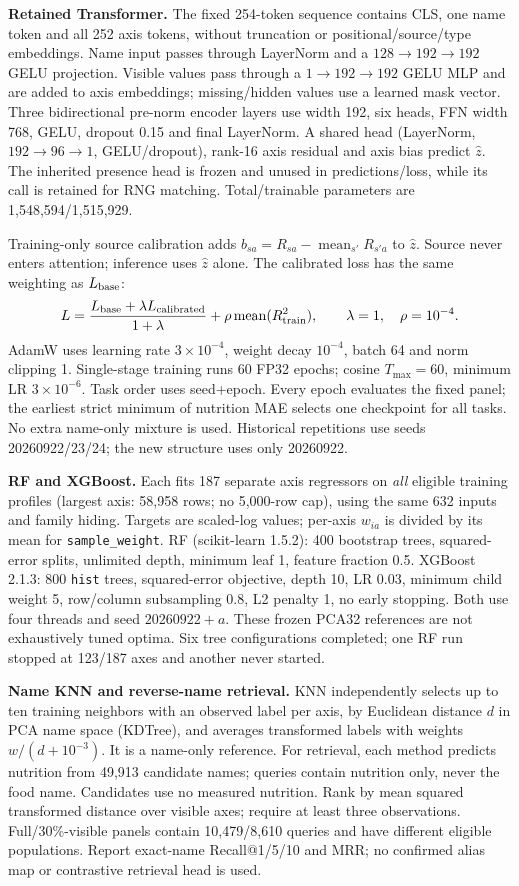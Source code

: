 \documentclass[10pt,a4paper]{article}
\newcommand{\sub}[1]{\textbf{#1}\enspace}
\begin{document}
\sub{Retained Transformer.}
The fixed 254-token sequence contains CLS, one name token and all 252 axis tokens, without truncation or positional/source/type embeddings. Name input passes through LayerNorm and a $128\to192\to192$ GELU projection. Visible values pass through a $1\to192\to192$ GELU MLP and are added to axis embeddings; missing/hidden values use a learned mask vector. Three bidirectional pre-norm encoder layers use width 192, six heads, FFN width 768, GELU, dropout 0.15 and final LayerNorm. A shared head (LayerNorm, $192\to96\to1$, GELU/dropout), rank-16 axis residual and axis bias predict $\hat z$. The inherited presence head is frozen and unused in predictions/loss, while its call is retained for RNG matching. Total/trainable parameters are 1,548,594/1,515,929.

Training-only source calibration adds $b_{sa}=R_{sa}-\operatorname{mean}_{s'}R_{s'a}$ to $\hat z$. Source never enters attention; inference uses $\hat z$ alone. The calibrated loss has the same weighting as $L_{\rm base}$:
\[
 L=\frac{L_{\rm base}+\lambda L_{\rm calibrated}}{1+\lambda}
   +\rho\operatorname{mean}(R_{\rm train}^{2}),\qquad \lambda=1,\quad\rho=10^{-4}.
\]
AdamW uses learning rate $3\times10^{-4}$, weight decay $10^{-4}$, batch 64 and norm clipping 1. Single-stage training runs 60 FP32 epochs; cosine $T_{\max}=60$, minimum LR $3\times10^{-6}$. Task order uses seed+epoch. Every epoch evaluates the fixed panel; the earliest strict minimum of nutrition MAE selects one checkpoint for all tasks. No extra name-only mixture is used. Historical repetitions use seeds 20260922/23/24; the new structure uses only 20260922.

\sub{RF and XGBoost.}
Each fits 187 separate axis regressors on \emph{all} eligible training profiles (largest axis: 58,958 rows; no 5,000-row cap), using the same 632 inputs and family hiding. Targets are scaled-log values; per-axis $w_{ia}$ is divided by its mean for \texttt{sample\_weight}. RF (scikit-learn 1.5.2): 400 bootstrap trees, squared-error splits, unlimited depth, minimum leaf 1, feature fraction 0.5. XGBoost 2.1.3: 800 \texttt{hist} trees, squared-error objective, depth 10, LR 0.03, minimum child weight 5, row/column subsampling 0.8, L2 penalty 1, no early stopping. Both use four threads and seed $20260922+a$. These frozen PCA32 references are not exhaustively tuned optima. Six tree configurations completed; one RF run stopped at 123/187 axes and another never started.

\sub{Name KNN and reverse-name retrieval.}
KNN independently selects up to ten training neighbors with an observed label per axis, by Euclidean distance $d$ in PCA name space (KDTree), and averages transformed labels with weights $w/(d+10^{-3})$. It is a name-only reference. For retrieval, each method predicts nutrition from 49,913 candidate names; queries contain nutrition only, never the food name. Candidates use no measured nutrition. Rank by mean squared transformed distance over visible axes; require at least three observations. Full/30\%-visible panels contain 10,479/8,610 queries and have different eligible populations. Report exact-name Recall@1/5/10 and MRR; no confirmed alias map or contrastive retrieval head is used.
\end{document}

